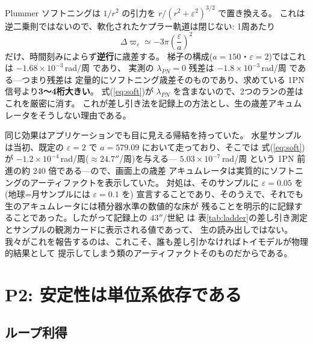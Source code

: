 \documentclass[a4paper,10pt,twocolumn]{ltjsarticle}
\begin{document}
Plummer ソフトニングは $1/r^{2}$ の引力を $r/(r^{2}+\varepsilon^{2})^{3/2}$ で置き換える。
これは逆二乗則ではないので、軟化されたケプラー軌道は閉じない: 1周あたり
\begin{equation}
  \Delta\varpi_{\varepsilon} \simeq -3\pi\left(\frac{\varepsilon}{a}
  \right)^{2}
  \label{eq:soft}
\end{equation}
だけ、時間刻みによらず\textbf{逆行}に歳差する。
梯子の構成($a=150$・$\varepsilon=2$)ではこれは $-1.68\times10^{-3}$\,rad/周 であり、
実測の $\lambda_{PN}=0$ 残差は $-1.8\times10^{-3}$\,rad/周 である---つまり残差は
定量的にソフトニング歳差そのものであり、求めている 1PN 信号より\textbf{3〜4桁大きい}。
式(\ref{eq:soft})が $\lambda_{PN}$ を含まないので、2つのランの差はこれを厳密に消す。
これが差し引き法を記録上の方法とし、生の歳差アキュムレータをそうしない理由である。

同じ効果はアプリケーションでも目に見える帰結を持っていた。
水星サンプルは当初、既定の $\varepsilon=2$ で $a=579.09$ において走っており、そこでは
式(\ref{eq:soft})が $-1.2\times10^{-4}$\,rad/周($\approx24.7''$/周)を与える---
$5.03\times10^{-7}$\,rad/周 という 1PN 前進の約 $240$ 倍である---ので、画面上の歳差
アキュムレータは実質的にソフトニングのアーティファクトを表示していた。
対処は、そのサンプルに $\varepsilon=0.05$ を(地球=月サンプルには $\varepsilon=0.1$ を)
宣言することであり、そのうえで、それでも生のアキュムレータには積分器水準の数値的な床が
残ることを明示的に記録することであった。したがって記録上の $43''$/世紀 は
表\ref{tab:ladder}の差し引き測定とサンプルの観測カードに表示される値であって、
生の読み出しではない。
我々がこれを報告するのは、これこそ、誰も差し引かなければトイモデルが物理的結果として
提示してしまう類のアーティファクトそのものだからである。

\section{P2: 安定性は単位系依存である}
\label{sec:p2}

\subsection{ループ利得}
\label{sec:p2gain}
\end{document}
